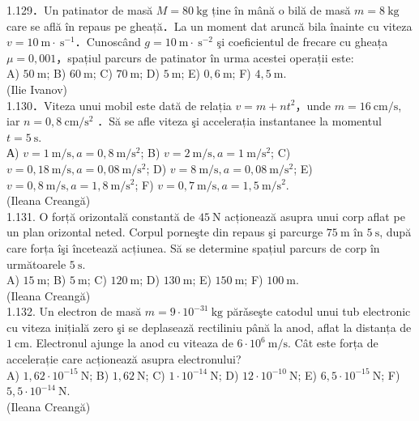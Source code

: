 1.129．Un patinator de masă $M=80 \mathrm{~kg}$ ține în mână o bilă de masă $m=8 \mathrm{~kg}$ care se află în repaus pe gheață．La un moment dat aruncă bila înainte cu viteza $v=10 \mathrm{~m} \cdot \mathrm{~s}^{-1}$．Cunoscând $g=10 \mathrm{~m} \cdot \mathrm{~s}^{-2}$ şi coeficientul de frecare cu gheața $\mu=0,001$，spațiul parcurs de patinator în urma acestei operații este:\\ A) $50 \mathrm{~m}$; B) $60 \mathrm{~m}$; C) $70 \mathrm{~m}$; D) $5 \mathrm{~m}$; E) $0,6 \mathrm{~m}$; F) $4,5 \mathrm{~m}$.\\ (Ilie Ivanov)\\

1.130．Viteza unui mobil este dată de relația $v=m+n t^{2}$，unde $m=16 \mathrm{~cm} / \mathrm{s}$, iar $n=0,8 \mathrm{~cm} / \mathrm{s}^{2}$ ．Să se afle viteza şi accelerația instantanee la momentul $t=5 \mathrm{~s}$.\\ А) $v=1 \mathrm{~m} / \mathrm{s}, a=0,8 \mathrm{~m} / \mathrm{s}^{2}$; B) $v=2 \mathrm{~m} / \mathrm{s}, a=1 \mathrm{~m} / \mathrm{s}^{2}$; C) $v=0,18 \mathrm{~m} / \mathrm{s}, a=0,08 \mathrm{~m} / \mathrm{s}^{2}$; D) $v=8 \mathrm{~m} / \mathrm{s}, a=0,08 \mathrm{~m} / \mathrm{s}^{2}$; E) $v=0,8 \mathrm{~m} / \mathrm{s}, a=1,8 \mathrm{~m} / \mathrm{s}^{2}$; F) $v=0,7 \mathrm{~m} / \mathrm{s}, a=1,5 \mathrm{~m} / \mathrm{s}^{2}$.\\ (Ileana Creangă)\\

1.131. O forță orizontală constantă de $45 \mathrm{~N}$ acționează asupra unui corp aflat pe un plan orizontal neted. Corpul porneşte din repaus şi parcurge $75 \mathrm{~m}$ în $5 \mathrm{~s}$, după care forța îşi încetează acțiunea. Să se determine spațiul parcurs de corp în următoarele $5 \mathrm{~s}$.\\ A) $15 \mathrm{~m}$; B) $5 \mathrm{~m}$; C) $120 \mathrm{~m}$; D) $130 \mathrm{~m}$; E) $150 \mathrm{~m}$; F) $100 \mathrm{~m}$.\\ (Ileana Creangă)\\

1.132. Un electron de masă $m=9 \cdot 10^{-31} \mathrm{~kg}$ părǎseşte catodul unui tub electronic cu viteza inițială zero şi se deplasează rectiliniu până la anod, aflat la distanța de $1 \mathrm{~cm}$. Electronul ajunge la anod cu viteaza de $6 \cdot 10^{6} \mathrm{~m} / \mathrm{s}$. Cât este forța de accelerație care acționează asupra electronului?\\ A) $1,62 \cdot 10^{-15} \mathrm{~N}$; B) $1,62 \mathrm{~N}$; C) $1 \cdot 10^{-14} \mathrm{~N}$; D) $12 \cdot 10^{-10} \mathrm{~N}$; E) $6,5 \cdot 10^{-15} \mathrm{~N}$; F) $5,5 \cdot 10^{-14} \mathrm{~N}$.\\ (Ileana Creangă)\\

